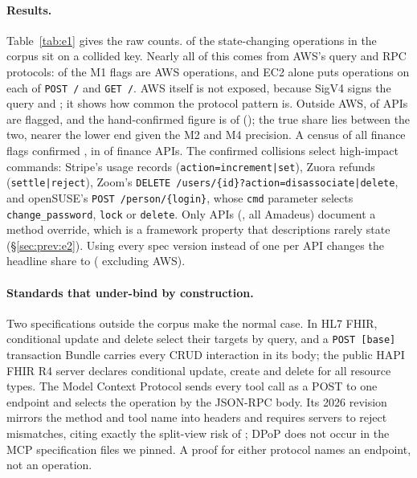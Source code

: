 \paragraph{Results.} Table~\ref{tab:e1} gives the raw counts.
\PctUnderBound{} \CIUnderBound{} of the \NumStateChangingOps{} state-changing
operations in the corpus sit on a collided key. Nearly all of this comes from
AWS's query and RPC protocols: \NumMOneOpsAWS{} of the \NumMOneOps{} M1 flags
are AWS operations, and EC2 alone puts \NumEcTwoOpsPerKey{} operations on each of
\texttt{POST /} and \texttt{GET /}. AWS itself is not exposed, because SigV4
signs the query and ; it shows how common the protocol pattern
is. Outside AWS, \PctApisCollidedNonAWS{} \CIApisCollidedNonAWS{} of APIs are
flagged, and the hand-confirmed figure is \NumConfirmedApisNonAWS{} of
\NumSpecsNonAWS{} (\PctConfirmedApisNonAWS); the true share lies between the
two, nearer the lower end given the M2 and M4 precision. A census of all
\NumFinanceFlagged{} finance flags confirmed \NumFinanceTP{}, in
\NumFinanceApisTP{} of \NumSpecsFinance{} finance APIs. The confirmed
collisions select high-impact commands: Stripe's usage records
(\texttt{action=increment|set}), Zuora refunds (\texttt{settle|reject}),
Zoom's \texttt{DELETE /users/\{id\}?action=disassociate|delete}, and openSUSE's \texttt{POST /person/\{login\}}, whose \texttt{cmd} parameter selects \texttt{change\_password}, \texttt{lock} or \texttt{delete}. Only
\NumApisDocOverride{} APIs (\PctApisDocOverride, all Amadeus) document a method
override, which is a framework property that descriptions rarely state
(\S\ref{sec:prev:e2}). Using every spec version instead of one per API changes
the headline share to \PctUnderBoundAllFiles{} (\PctUnderBoundAllFilesNonAWS{}
excluding AWS).

\paragraph{Standards that under-bind by construction.} Two specifications
outside the corpus make \GA the normal case. In HL7 FHIR, conditional
update and delete select their targets by query, and a \texttt{POST [base]}
transaction Bundle carries every CRUD interaction in its body; the public HAPI
FHIR R4 server declares conditional update, create and delete for all
\NumFhirTypesConditional{} resource types. The Model Context Protocol sends every
tool call as a POST to one endpoint and selects the operation by the JSON-RPC
body. Its 2026 revision mirrors the method and tool name into headers and
requires servers to reject mismatches, citing exactly the split-view risk of
\GB; DPoP does not occur in the MCP specification files we pinned. A proof
for either protocol names an endpoint, not an operation.

